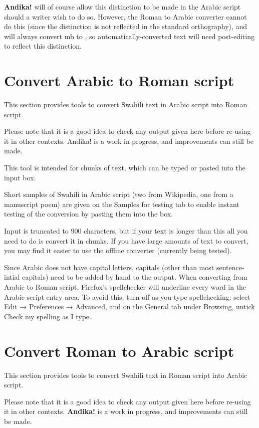 \documentclass[a4paper,10pt, oneside]{book}
\newcommand\AS[1]{{\citationfont\RLE{#1}}}
\begin{document}
\textbf{Andika!} will of course allow this distinction to be made in the Arabic script should a writer wish to do so. However, the Roman to Arabic converter cannot do this (since the distinction is not reflected in the standard orthography), and will always convert mb to \AS{مْب}, so automatically-converted text will need post-editing to reflect this distinction.


\chapter{Convert Arabic to Roman script}

This section provides tools to convert Swahili text in Arabic script into Roman script.

Please note that it is a good idea to check any output given here before re-using it in other contexts. Andika! is a work in progress, and improvements can still be made.

This tool is intended for chunks of text, which can be typed or pasted into the input box.

Short samples of Swahili in Arabic script (two from Wikipedia, one from a manuscript poem) are given on the Samples for testing tab to enable instant testing of the conversion by pasting them into the box.

Input is truncated to 900 characters, but if your text is longer than this all you need to do is convert it in chunks. If you have large amounts of text to convert, you may find it easier to use the offline converter (currently being tested).

Since Arabic does not have capital letters, capitals (other than most sentence-intial capitals) need to be added by hand to the output.
When converting from Arabic to Roman script, Firefox's spellchecker will underline every word in the Arabic script entry area. To avoid this, turn off as-you-type spellchecking: select Edit → Preferences → Advanced, and on the General tab under Browsing, untick Check my spelling as I type.


\chapter{Convert Roman to Arabic script}

This section provides tools to convert Swahili text in Roman script into Arabic script.

Please note that it is a good idea to check any output given here before re-using it in other contexts. \textbf{Andika!} is a work in progress, and improvements can still be made.
\end{document}
